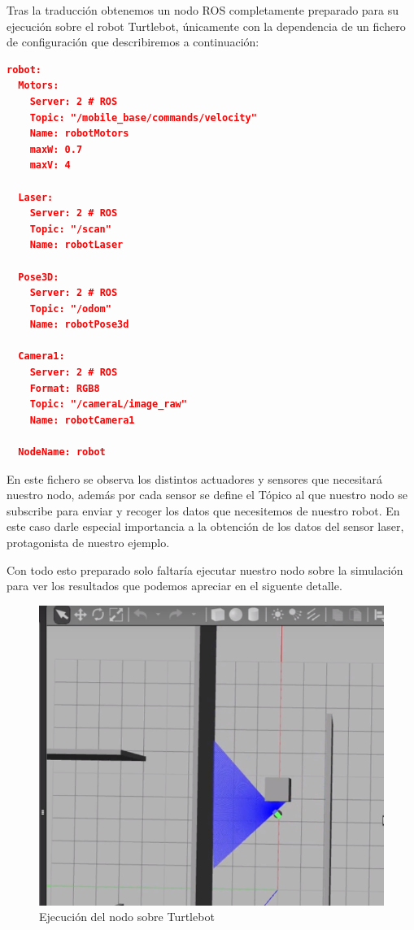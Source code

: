 Tras la traducción obtenemos un nodo ROS completamente preparado para su ejecución sobre el robot Turtlebot, únicamente con la dependencia de un fichero de configuración que describiremos a continuación:
\pagebreak
\begin{lstlisting}[language=json,firstnumber=1]
robot:
  Motors:
    Server: 2 # ROS
    Topic: "/mobile_base/commands/velocity"
    Name: robotMotors
    maxW: 0.7
    maxV: 4

  Laser:
    Server: 2 # ROS
    Topic: "/scan"
    Name: robotLaser

  Pose3D:
    Server: 2 # ROS
    Topic: "/odom"
    Name: robotPose3d

  Camera1:
    Server: 2 # ROS
    Format: RGB8
    Topic: "/cameraL/image_raw"
    Name: robotCamera1

  NodeName: robot
\end{lstlisting}
En este fichero se observa los distintos actuadores y sensores que necesitará nuestro nodo, además por cada sensor se define el Tópico al que nuestro nodo se subscribe para enviar y recoger los datos que necesitemos de nuestro robot. En este caso darle especial importancia a la obtención de los datos del sensor laser, protagonista de nuestro ejemplo.

Con todo esto preparado solo faltaría ejecutar nuestro nodo sobre la simulación para ver los resultados que podemos apreciar en el siguente detalle.

\begin{figure}[H]
    \centering
    \includegraphics[scale=0.75]{img/robot-example.PNG}
  	\caption{Ejecución del nodo sobre Turtlebot}
  	\label{fig:turtlebot}
\end{figure}


